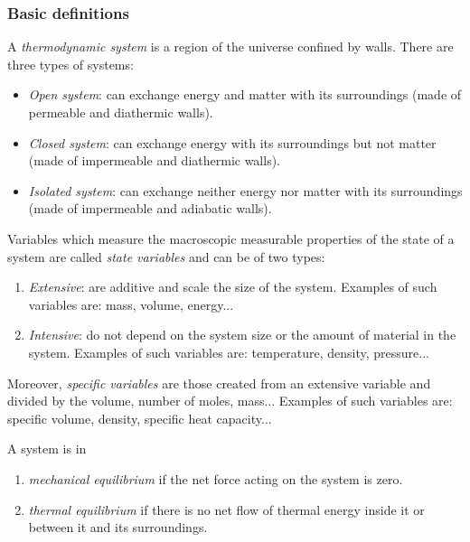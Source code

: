 \documentclass[../../../main.tex]{subfiles}
\begin{document}
\begin{multicols}{2}
    \subsubsection{Basic definitions}
    \begin{definition}
        A \textit{thermodynamic system} is a region of the universe confined by walls. There are three types of systems:
        \begin{itemize}
            \item \textit{Open system}: can exchange energy and matter with its surroundings (made of permeable and diathermic walls).
            \item \textit{Closed system}: can exchange energy with its surroundings but not matter (made of impermeable and diathermic walls).
            \item \textit{Isolated system}: can exchange neither energy nor matter with its surroundings (made of impermeable and adiabatic walls).
        \end{itemize}
    \end{definition}
    \begin{definition}
        Variables which measure the macroscopic measurable properties of the state of a system are called \textit{state variables} and can be of two types:
        \begin{enumerate}
            \item \textit{Extensive}: are additive and scale the size of the system. Examples of such variables are: mass, volume, energy...
            \item \textit{Intensive}: do not depend on the system size or the amount of material in the system. Examples of such variables are: temperature, density, pressure...
        \end{enumerate}
        Moreover, \textit{specific variables} are those created from an extensive variable and divided by the volume, number of moles, mass... Examples of such variables are: specific volume, density, specific heat capacity...
    \end{definition}
    \begin{definition}
        A system is in
        \begin{enumerate}
            \item \textit{mechanical equilibrium} if the net force acting on the system is zero.
            \item \textit{thermal equilibrium} if there is no net flow of thermal energy inside it or between it and its surroundings.

\end{enumerate}
\end{definition}
\end{multicols}
\end{document}
